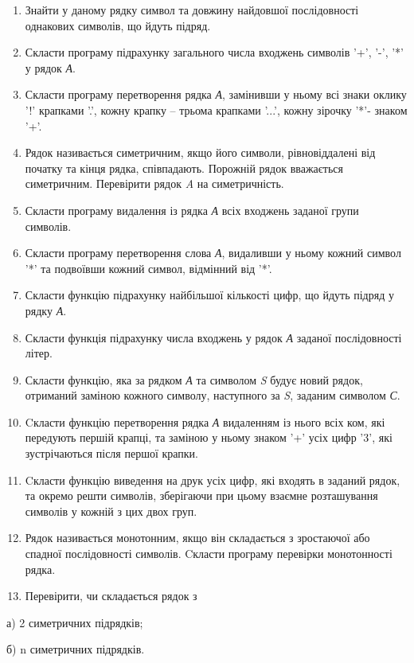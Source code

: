 \documentclass[]{article}
\begin{document}
\begin{enumerate}
\def\labelenumi{\arabic{enumi})}
\item
  Знайти у даному рядку символ та довжину найдовшої послідовності
  однакових символів, що йдуть підряд.
\item
  Скласти програму підрахунку загального числа входжень символів '+',
  '-', '*' у рядок \emph{А}.
\item
  Скласти програму перетворення рядка \emph{А}, замінивши у ньому всі
  знаки оклику '!' крапками '.', кожну крапку -- трьома крапками '...',
  кожну зірочку '*'- знаком '+'.
\item
  Рядок називається симетричним, якщо його символи, рівновіддалені від
  початку та кінця рядка, співпадають. Порожній рядок вважається
  симетричним. Перевірити рядок \emph{A} на симетричність.
\item
  Скласти програму видалення із рядка \emph{А} всіх входжень заданої
  групи символів.
\item
  Скласти програму перетворення слова \emph{А}, видаливши у ньому кожний
  символ '*' та подвоївши кожний символ, відмінний від '*'.
\item
  Скласти функцію підрахунку найбільшої кількості цифр, що йдуть підряд
  у рядку \emph{А}.
\item
  Скласти функція підрахунку числа входжень у рядок \emph{А} заданої
  послідовності літер.
\item
  Скласти функцію, яка за рядком \emph{А} та символом \emph{S} будує
  новий рядок, отриманий заміною кожного символу, наступного за
  \emph{S}, заданим символом \emph{С}.
\item
  Cкласти функцію перетворення рядка \emph{А} видаленням із нього всіх
  ком, які передують першій крапці, та заміною у ньому знаком '+' усіх
  цифр '3', які зустрічаються після першої крапки.
\item
  Cкласти функцію виведення на друк усіх цифр, які входять в заданий
  рядок, та окремо решти символів, зберігаючи при цьому взаємне
  розташування символів у кожній з цих двох груп.
\item
  Рядок називається монотонним, якщо він складається з зростаючої або
  спадної послідовності символів. Cкласти програму перевірки
  монотонності рядка.
\item
  Перевірити, чи складається рядок з
\end{enumerate}

а) 2 симетричних підрядків;

б) n симетричних підрядків.
\end{document}
